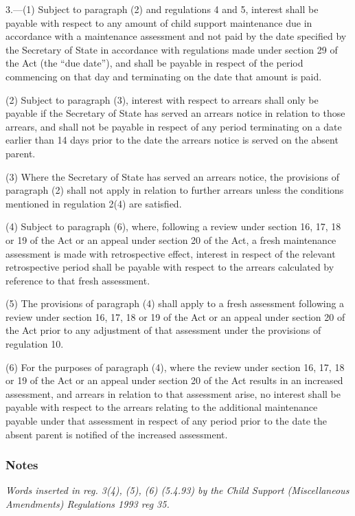 \documentclass[a4paper]{article}
\newcommand\amendment[1]{\subsubsection*{Notes}{\itshape\frenchspacing\footnotesize #1 \par}}
\begin{document}
3.—(1) Subject to paragraph (2) and regulations 4 and 5, interest shall be payable with respect to any amount of child support maintenance due in accordance with a maintenance assessment and not paid by the date specified by the Secretary of State in accordance with regulations made under section 29 of the Act (the “due date”), and shall be payable in respect of the period commencing on that day and terminating on the date that amount is paid.

(2) Subject to paragraph (3), interest with respect to arrears shall only be payable if the Secretary of State has served an arrears notice in relation to those arrears, and shall not be payable in respect of any period terminating on a date earlier than 14 days prior to the date the arrears notice is served on the absent parent.

(3) Where the Secretary of State has served an arrears notice, the provisions of paragraph (2) shall not apply in relation to further arrears unless the conditions mentioned in regulation 2(4) are satisfied.

(4) Subject to paragraph (6), where, following a review under section 
16, 17, %
18 or 19 of the Act or an appeal under section 20 of the Act, a fresh maintenance assessment is made with retrospective effect, interest in respect of the relevant retrospective period shall be payable with respect to the arrears calculated by reference to that fresh assessment.

(5) The provisions of paragraph (4) shall apply to a fresh assessment following a review under section 
16, 17, %
18 or 19 of the Act or an appeal under section 20 of the Act prior to any adjustment of that assessment under the provisions of regulation 10.

(6) For the purposes of paragraph (4), where the review under section 
16, 17, %
18 or 19 of the Act or an appeal under section 20 of the Act results in an increased assessment, and arrears in relation to that assessment arise, no interest shall be payable with respect to the arrears relating to the additional maintenance payable under that assessment in respect of any period prior to the date the absent parent is notified of the increased assessment.

\amendment{
Words inserted in reg. 3(4), (5), (6) (5.4.93) by the Child Support (Miscellaneous Amendments) Regulations 1993 reg 35.
}
\end{document}
